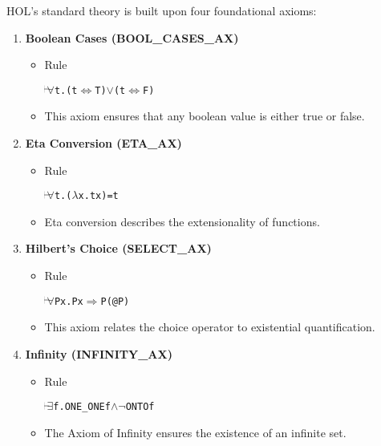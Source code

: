 \begin{enumerate}
\begin{itemize}
    \end{itemize}


\end{enumerate}

HOL’s standard theory is built upon four foundational axioms:
\begin{enumerate}
    \item \textbf{Boolean Cases (BOOL\_CASES\_AX)}
    \begin{itemize}
        \item Rule
          \begin{alltt}
            \(\!\!\!{\turn}\!\!\!\!\) \(\forall\)t. (t \({\Leftrightarrow}\) T) \(\lor\) (t \({\Leftrightarrow}\) F)
          \end{alltt}
        \item This axiom ensures that any boolean value is either true or false.
    \end{itemize}

    \item \textbf{Eta Conversion (ETA\_AX)}
    \begin{itemize}
        \item Rule
          \begin{alltt}
            \(\!\!\!{\turn}\!\!\!\!\) \(\forall\)t. (\(\lambda\)x. t x) = t
          \end{alltt}
        \item Eta conversion describes the extensionality of functions.
    \end{itemize}

    \item \textbf{Hilbert’s Choice (SELECT\_AX)}
    \begin{itemize}
        \item Rule
          \begin{alltt}
            \(\!\!\!{\turn}\!\!\!\!\) \(\forall\)P x. P x \(\Rightarrow\) P (@ P)
          \end{alltt}
        \item This axiom relates the choice operator to existential quantification.
    \end{itemize}

    \item \textbf{Infinity (INFINITY\_AX)}
    \begin{itemize}
        \item Rule
          \begin{alltt}
            \(\!\!\!{\turn}\!\!\!\!\) \(\exists\)f. ONE_ONE f \(\land\) \(\neg\)ONTO f
          \end{alltt}
        \item The Axiom of Infinity ensures the existence of an infinite set.
    \end{itemize}

\end{enumerate}


